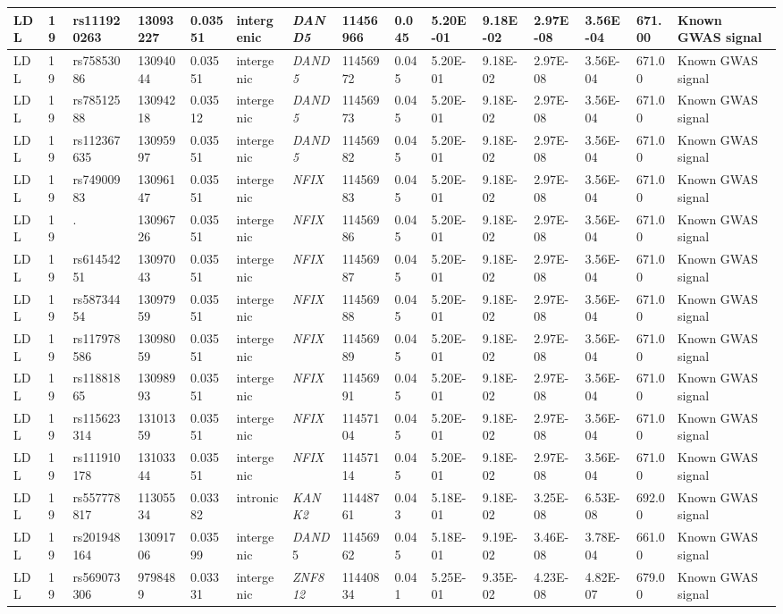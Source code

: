 \begin{landscape}
\begin{table}
\begin{adjustbox}{max width=\linewidth}
\begin{tabular}{@{}p{2cm}|p{0.5cm}p{2cm}p{2cm}p{1.5cm}p{3cm}p{2.5cm}p{1.5cm}p{1cm}p{2cm}p{2cm}p{2cm}p{2cm}p{1.5cm}p{4cm}@{}}
LDL&19&rs111920263&13093227&0.03551&intergenic&\emph{DAND5}&11456966&0.045&5.20E-01&9.18E-02&2.97E-08&3.56E-04&671.00&Known GWAS signal\\ \hline
LDL&19&rs75853086&13094044&0.03551&intergenic&\emph{DAND5}&11456972&0.045&5.20E-01&9.18E-02&2.97E-08&3.56E-04&671.00&Known GWAS signal\\ \hline
LDL&19&rs78512588&13094218&0.03512&intergenic&\emph{DAND5}&11456973&0.045&5.20E-01&9.18E-02&2.97E-08&3.56E-04&671.00&Known GWAS signal\\ \hline
LDL&19&rs112367635&13095997&0.03551&intergenic&\emph{DAND5}&11456982&0.045&5.20E-01&9.18E-02&2.97E-08&3.56E-04&671.00&Known GWAS signal\\ \hline
LDL&19&rs74900983&13096147&0.03551&intergenic&\emph{NFIX}&11456983&0.045&5.20E-01&9.18E-02&2.97E-08&3.56E-04&671.00&Known GWAS signal\\ \hline
LDL&19&.&13096726&0.03551&intergenic&\emph{NFIX}&11456986&0.045&5.20E-01&9.18E-02&2.97E-08&3.56E-04&671.00&Known GWAS signal\\ \hline
LDL&19&rs61454251&13097043&0.03551&intergenic&\emph{NFIX}&11456987&0.045&5.20E-01&9.18E-02&2.97E-08&3.56E-04&671.00&Known GWAS signal\\ \hline
LDL&19&rs58734454&13097959&0.03551&intergenic&\emph{NFIX}&11456988&0.045&5.20E-01&9.18E-02&2.97E-08&3.56E-04&671.00&Known GWAS signal\\ \hline
LDL&19&rs117978586&13098059&0.03551&intergenic&\emph{NFIX}&11456989&0.045&5.20E-01&9.18E-02&2.97E-08&3.56E-04&671.00&Known GWAS signal\\ \hline
LDL&19&rs11881865&13098993&0.03551&intergenic&\emph{NFIX}&11456991&0.045&5.20E-01&9.18E-02&2.97E-08&3.56E-04&671.00&Known GWAS signal\\ \hline
LDL&19&rs115623314&13101359&0.03551&intergenic&\emph{NFIX}&11457104&0.045&5.20E-01&9.18E-02&2.97E-08&3.56E-04&671.00&Known GWAS signal\\ \hline
LDL&19&rs111910178&13103344&0.03551&intergenic&\emph{NFIX}&11457114&0.045&5.20E-01&9.18E-02&2.97E-08&3.56E-04&671.00&Known GWAS signal\\ \hline
LDL&19&rs557778817&11305534&0.03382&intronic&\emph{KANK2}&11448761&0.043&5.18E-01&9.18E-02&3.25E-08&6.53E-08&692.00&Known GWAS signal\\ \hline
LDL&19&rs201948164&13091706&0.03599&intergenic&\emph{DAND}5&11456962&0.045&5.18E-01&9.19E-02&3.46E-08&3.78E-04&661.00&Known GWAS signal\\ \hline
LDL&19&rs569073306&9798489&0.03331&intergenic&\emph{ZNF812}&11440834&0.041&5.25E-01&9.35E-02&4.23E-08&4.82E-07&679.00&Known GWAS signal\\ \hline

\end{tabular}
\end{adjustbox}
\end{table}
\end{landscape}
